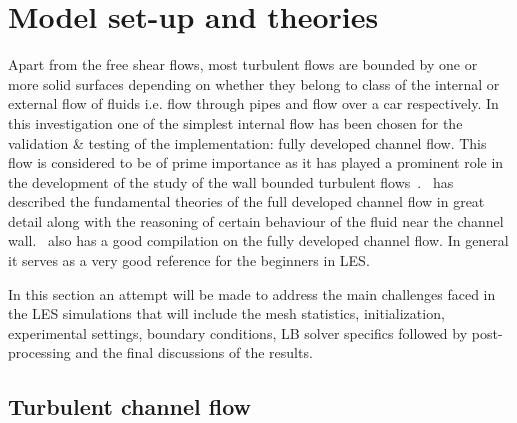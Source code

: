 \newpage

\section{Model set-up and theories}

Apart from the free shear flows, most turbulent flows are bounded by one or more solid surfaces depending on whether they belong to class of the internal or external flow of fluids i.e. flow through pipes and flow over a car respectively.  In this investigation one of the simplest internal flow has been chosen for the validation \& testing of the implementation: fully developed channel flow. This flow is considered to be of prime importance as it has played a prominent role in the development of the study of the wall bounded turbulent flows~\cite{pope:book}.~\cite{pope:book} has described the fundamental theories of the full developed channel flow in great detail along with the reasoning of certain behaviour of the fluid near the channel wall.~\cite{froehlich:book} also has a good compilation on the fully developed channel flow. In general it serves as a very good reference for the beginners in LES.

In this section an attempt will be made to address the main challenges faced in the LES simulations that will include the mesh statistics, initialization, experimental settings, boundary conditions, LB solver specifics followed by post-processing and the final discussions of the results. 

\subsection{Turbulent channel flow}

